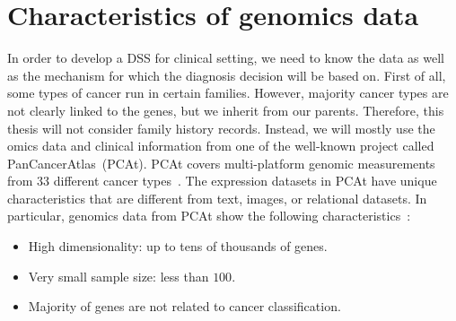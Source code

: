 
\section{Characteristics of genomics data}
In order to develop a DSS for clinical setting, we need to know the data as well as the mechanism for which the diagnosis decision will be based on. First of all, some types of cancer run in certain families. However, majority cancer types are not clearly linked to the genes, but we inherit from our parents. Therefore, this thesis will not consider family history records. Instead, we will mostly use the omics data and clinical information from one of the well-known project called PanCancerAtlas~(PCAt). PCAt covers multi-platform genomic measurements from 33 different cancer types~\cite{pancan}. 
The expression datasets in PCAt have unique characteristics that are different from text, images, or relational datasets. In particular, genomics data from PCAt show the following characteristics~\cite{lu2003cancer}:

\vspace{-2mm}
\begin{itemize}[noitemsep]
    \item High dimensionality: up to tens of thousands of genes.
    \item Very small sample size: less than $100$.
    \item Majority of genes are not related to cancer classification.
\end{itemize}
\vspace{-2mm}

